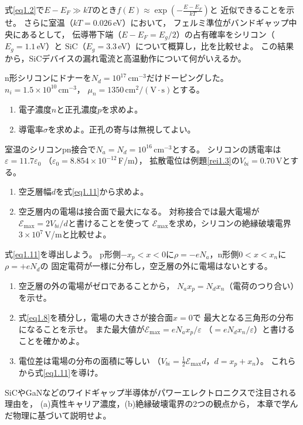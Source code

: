 \begin{章末問題}
\item \label{ex1.1}
式\ref{eq1.2}で$E - E_F \gg kT$のとき$f(E) \approx \exp\left(-\frac{E-E_F}{kT}\right)$と
近似できることを示せ。
さらに室温（$kT = 0.026$\,eV）において，
フェルミ準位がバンドギャップ中央にあるとして，
伝導帯下端（$E - E_F = E_g/2$）の占有確率をシリコン（$E_g = 1.1$\,eV）と
SiC（$E_g = 3.3$\,eV）について概算し，比を比較せよ。
この結果から，SiCデバイスの漏れ電流と高温動作について何がいえるか。

\item \label{ex1.2}
n形シリコンにドナーを$N_d = 10^{17}\,\mathrm{cm^{-3}}$だけドーピングした。
$n_i = 1.5\times10^{10}\,\mathrm{cm^{-3}}$，
$\mu_n = 1350\,\mathrm{cm^2/(V\cdot s)}$とする。
\begin{enumerate}
\item[(a)] 電子濃度$n$と正孔濃度$p$を求めよ。
\item[(b)] 導電率$\sigma$を求めよ。正孔の寄与は無視してよい。
\end{enumerate}

\item \label{ex1.3}
室温のシリコンpn接合で$N_a = N_d = 10^{16}\,\mathrm{cm^{-3}}$とする。
シリコンの誘電率は$\varepsilon = 11.7\varepsilon_0$
（$\varepsilon_0 = 8.854\times10^{-12}$\,F/m），
拡散電位は例題\ref{rei1.3}の$V_{bi} = 0.70$\,Vとする。
\begin{enumerate}
\item[(a)] 空乏層幅$d$を式\ref{eq1.11}から求めよ。
\item[(b)] 空乏層内の電場は接合面で最大になる。
対称接合では最大電場が$\mathcal{E}_{\max} = 2V_{bi}/d$と書けることを使って
$\mathcal{E}_{\max}$を求め，シリコンの絶縁破壊電界$3\times10^7$\,V/mと比較せよ。
\end{enumerate}

\item \label{ex1.4}
式\ref{eq1.11}を導出しよう。
p形側$-x_p < x < 0$に$\rho = -eN_a$，n形側$0 < x < x_n$に$\rho = +eN_d$の
固定電荷が一様に分布し，空乏層の外に電場はないとする。
\begin{enumerate}
\item[(a)] 空乏層の外の電場がゼロであることから，
$N_a x_p = N_d x_n$（電荷のつり合い）を示せ。
\item[(b)] 式\ref{eq1.8}を積分し，電場の大きさが接合面$x=0$で
最大となる三角形の分布になることを示せ。
また最大値が$\mathcal{E}_{\max} = eN_a x_p/\varepsilon$
（$= eN_d x_n/\varepsilon$）と書けることを確かめよ。
\item[(c)] 電位差は電場の分布の面積に等しい
（$V_{bi} = \frac{1}{2}\mathcal{E}_{\max}d$，$d = x_p + x_n$）。
これらから式\ref{eq1.11}を導け。
\end{enumerate}

\item \label{ex1.5}
SiCやGaNなどのワイドギャップ半導体がパワーエレクトロニクスで注目される理由を，
(a)真性キャリア濃度，(b)絶縁破壊電界の2つの観点から，
本章で学んだ物理に基づいて説明せよ。
\end{章末問題}
